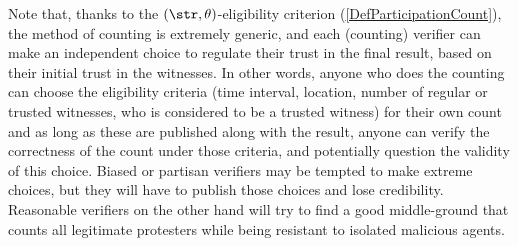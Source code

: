 Note that, thanks to the \((\str,\theta)\)-eligibility criterion
(\cref{DefParticipationCount}), the method of counting is extremely
generic, and each (counting) verifier can make an independent choice to regulate their trust in the final result, based on their initial trust in the witnesses. In other words, anyone who does the counting can choose the eligibility
criteria (time interval, location, number of regular or trusted
witnesses, who is considered to be a trusted witness) for their own count
and as long as these are published along with the result, anyone can
verify the correctness of the count under those criteria, and potentially question the validity of this choice. Biased or partisan verifiers may be tempted to make extreme choices, but they will have to publish those choices and lose credibility. Reasonable verifiers on the other hand will try to find a good middle-ground that counts all legitimate protesters while being resistant to isolated malicious agents.


